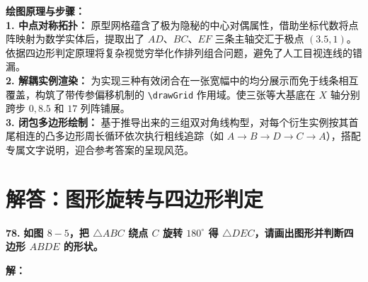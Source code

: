 \vspace{0.4cm}
{\small\color{blue!70!black}
\textbf{绘图原理与步骤：}\\
\textbf{1. 中点对称拓扑：} 原型网格蕴含了极为隐秘的中心对偶属性，借助坐标代数将点阵映射为数学实体后，提取出了 $AD$、$BC$、$EF$ 三条主轴交汇于极点 $(3.5, 1)$。依据四边形判定原理将复杂视觉穷举化作排列组合问题，避免了人工目视连线的错漏。\\
\textbf{2. 解耦实例渲染：} 为实现三种有效闭合在一张宽幅中的均分展示而免于线条相互覆盖，构筑了带传参偏移机制的 \texttt{\textbackslash drawGrid} 作用域。使三张等大基底在 $X$ 轴分别跨步 $0, 8.5$ 和 $17$ 列阵铺展。\\
\textbf{3. 闭包多边形绘制：} 基于推导出来的三组双对角线构型，对每个衍生实例按其首尾相连的凸多边形周长循环依次执行粗线追踪（如 $A\to B\to D\to C\to A$），搭配专属文字说明，迎合参考答案的呈现风范。
}

\newpage


\section{解答：图形旋转与四边形判定}

\vspace{0.6cm}

\textbf{\LARGE 78.} \textbf{如图 $8-5$，把 $\triangle ABC$ 绕点 $C$ 旋转 $180^\circ$ 得 $\triangle DEC$，请画出图形并判断四边形 $ABDE$ 的形状。}

\vspace{0.4cm}
\textbf{解：}

